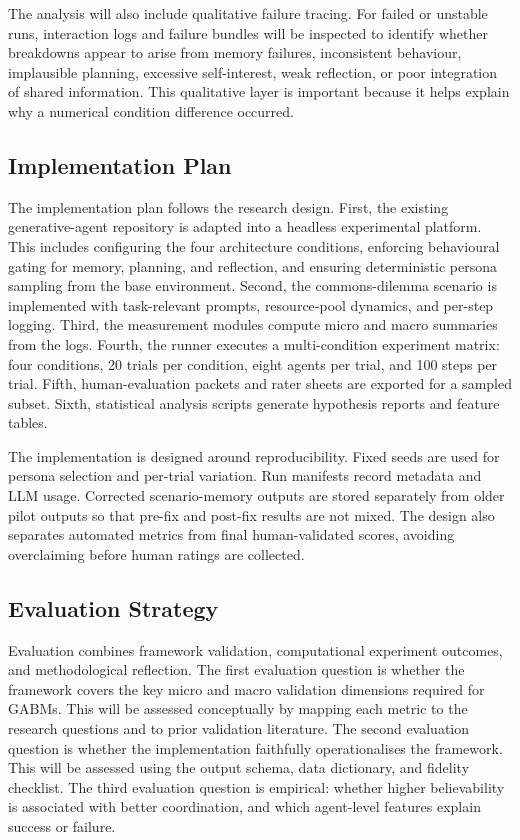 \documentclass[11pt]{article}
\begin{document}
The analysis will also include qualitative failure tracing. For failed or unstable runs, interaction logs and failure bundles will be inspected to identify whether breakdowns appear to arise from memory failures, inconsistent behaviour, implausible planning, excessive self-interest, weak reflection, or poor integration of shared information. This qualitative layer is important because it helps explain why a numerical condition difference occurred.

\subsection{Implementation Plan}
The implementation plan follows the research design. First, the existing generative-agent repository is adapted into a headless experimental platform. This includes configuring the four architecture conditions, enforcing behavioural gating for memory, planning, and reflection, and ensuring deterministic persona sampling from the base environment. Second, the commons-dilemma scenario is implemented with task-relevant prompts, resource-pool dynamics, and per-step logging. Third, the measurement modules compute micro and macro summaries from the logs. Fourth, the runner executes a multi-condition experiment matrix: four conditions, 20 trials per condition, eight agents per trial, and 100 steps per trial. Fifth, human-evaluation packets and rater sheets are exported for a sampled subset. Sixth, statistical analysis scripts generate hypothesis reports and feature tables.

The implementation is designed around reproducibility. Fixed seeds are used for persona selection and per-trial variation. Run manifests record metadata and LLM usage. Corrected scenario-memory outputs are stored separately from older pilot outputs so that pre-fix and post-fix results are not mixed. The design also separates automated metrics from final human-validated scores, avoiding overclaiming before human ratings are collected.

\subsection{Evaluation Strategy}
Evaluation combines framework validation, computational experiment outcomes, and methodological reflection. The first evaluation question is whether the framework covers the key micro and macro validation dimensions required for GABMs. This will be assessed conceptually by mapping each metric to the research questions and to prior validation literature. The second evaluation question is whether the implementation faithfully operationalises the framework. This will be assessed using the output schema, data dictionary, and fidelity checklist. The third evaluation question is empirical: whether higher believability is associated with better coordination, and which agent-level features explain success or failure.
\end{document}
